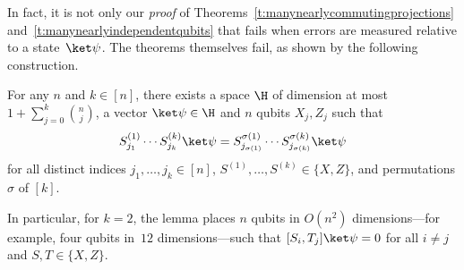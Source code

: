 \documentclass[11pt]{article}
\begin{document}
In fact, it is not only our \emph{proof} of Theorems~\ref{t:manynearlycommutingprojections} and~\ref{t:manynearlyindependentqubits} that fails when errors are measured relative to a state~$\ket \psi$.  The theorems themselves fail, as shown by the following construction. 

\begin{lemma} \label{t:kcommute}
For any $n$ and $k \in [n]$, there exists a space $\H$ of dimension at most $1 + \sum_{j=0}^k {n \choose j}$, a vector $\ket \psi \in \H$ and $n$ qubits $X_j, Z_j$ such that 
\begin{equation*}
S^{(1)}_{j_1} \cdots S^{(k)}_{j_k} \ket \psi = S_{j_{\sigma(1)}}^{\sigma(1)} \cdots S_{j_{\sigma(k)}}^{\sigma(k)} \ket \psi
\end{equation*}
for all distinct indices $j_1, \ldots, j_k \in [n]$, $S^{(1)}, \ldots, S^{(k)} \in \{X, Z\}$, and permutations $\sigma$ of $[k]$.  
\end{lemma}

In particular, for $k = 2$, the lemma places $n$ qubits in $O(n^2)$ dimensions---for example, four qubits in~$12$ dimensions---such that $[S_i, T_j] \ket \psi = 0$ for all $i \neq j$ and $S,T\in\{X,Z\}$.    
\end{document}
